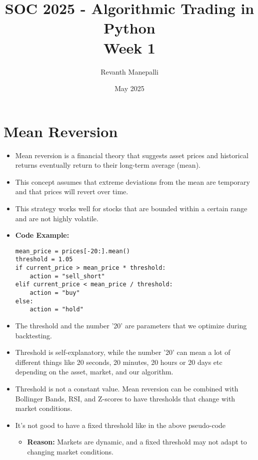 \documentclass{article}
\title{SOC 2025 - Algorithmic Trading in Python\\Week 1}
\author{Revanth Manepalli}
\date{May 2025}
\begin{document}
\maketitle

\section*{Mean Reversion}
\begin{itemize}
    \item Mean reversion is a financial theory that suggests asset prices and historical returns eventually return to their long-term average (mean).
    \item This concept assumes that extreme deviations from the mean are temporary and that prices will revert over time.
    \item This strategy works well for stocks that are bounded within a certain range and are not highly volatile.
    \item \textbf{Code Example:}
    \begin{lstlisting}
mean_price = prices[-20:].mean()
threshold = 1.05
if current_price > mean_price * threshold:
    action = "sell_short"
elif current_price < mean_price / threshold:
    action = "buy"
else:
    action = "hold"
    \end{lstlisting}
    \item The threshold and the number '20' are parameters that we optimize during backtesting.
    \item Threshold is self-explanatory, while the number '20' can mean a lot of different things like 20 seconds, 20 minutes, 20 hours or 20 days etc depending on the asset, market, and our algorithm.
    \item Threshold is not a constant value. Mean reversion can be combined with Bollinger Bands, RSI, and Z-scores to have thresholds that change with market conditions.
    \item It's not good to have a fixed threshold like in the above pseudo-code
    \begin{itemize}
        \item \textbf{Reason: } Markets are dynamic, and a fixed threshold may not adapt to changing market conditions.
    \end{itemize}
\end{itemize}
\end{document}
